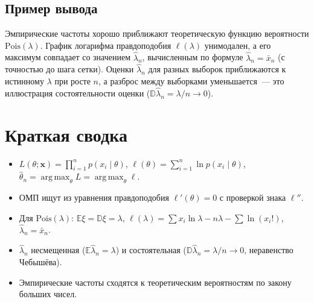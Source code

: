 \documentclass[a4paper,12pt]{article}
\theoremstyle{definition}
\theoremstyle{plain}
\theoremstyle{remark}
\DeclareMathOperator*{\argmax}{arg\,max}
\newcommand{\E}{\mathbb{E}}
\newcommand{\D}{\mathbb{D}}
\begin{document}
\subsection{Пример вывода}

Эмпирические частоты хорошо приближают теоретическую функцию вероятности $\mathrm{Pois}(\lambda)$. График логарифма правдоподобия $\ell(\lambda)$ унимодален, а его максимум совпадает со значением $\hat\lambda_n$, вычисленным по формуле $\hat\lambda_n=\bar x_n$ (с точностью до шага сетки). Оценки $\hat\lambda_n$ для разных выборок приближаются к истинному $\lambda$ при росте $n$, а разброс между выборками уменьшается~--- это иллюстрация состоятельности оценки ($\D\hat\lambda_n=\lambda/n\to0$).

\section*{Краткая сводка}

\begin{itemize}
  \item $L(\theta;\mathbf x)=\prod_{i=1}^n p(x_i\mid\theta)$, $\ell(\theta)=\sum_{i=1}^n\ln p(x_i\mid\theta)$, $\hat\theta_n=\argmax_\theta L=\argmax_\theta\ell$.
  \item ОМП ищут из уравнения правдоподобия $\ell'(\theta)=0$ с проверкой знака $\ell''$.
  \item Для $\mathrm{Pois}(\lambda)$: $\E\xi=\D\xi=\lambda$, $\ell(\lambda)=\sum x_i\ln\lambda-n\lambda-\sum\ln(x_i!)$, $\hat\lambda_n=\bar x_n$.
  \item $\hat\lambda_n$ несмещенная ($\E\hat\lambda_n=\lambda$) и состоятельная ($\D\hat\lambda_n=\lambda/n\to0$, неравенство Чебышёва).
  \item Эмпирические частоты сходятся к теоретическим вероятностям по закону больших чисел.
\end{itemize}
\end{document}
